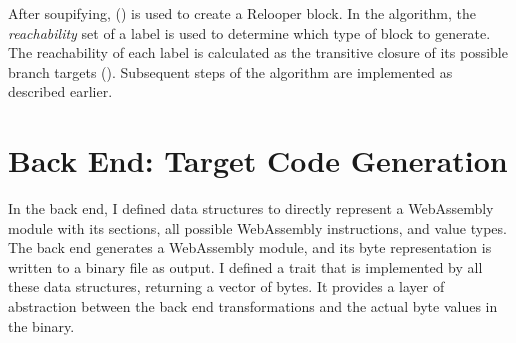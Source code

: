 \documentclass[00-main.tex]{subfiles}
\begin{document}
After soupifying,  () is used to create a Relooper block.
In the algorithm, the \emph{reachability} set of a label is used to determine which type of block to generate.
The reachability of each label is calculated as the transitive closure of its possible branch targets ().
Subsequent steps of the algorithm are implemented as described earlier.



\section{Back End: Target Code Generation}\label{sec:impl:back end}

In the back end, I defined data structures to directly represent a WebAssembly module with its sections, all possible WebAssembly instructions, and value types.
The back end generates a Web\-Assembly module, and its byte representation is written to a binary file as output.
I defined a  trait that is implemented by all these data structures, returning a vector of bytes.
It provides a layer of abstraction between the back end transformations and the actual byte values in the binary.
\end{document}
